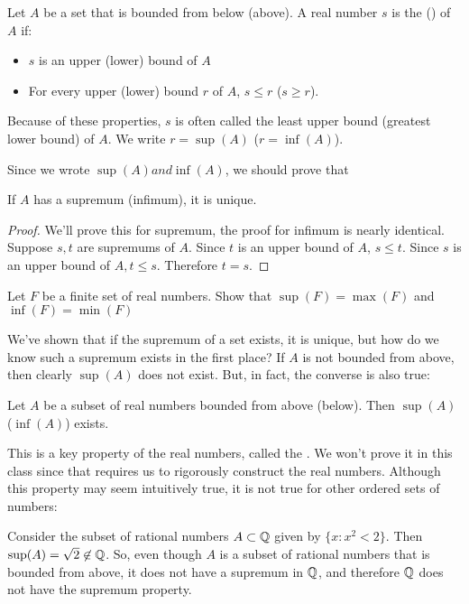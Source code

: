 \documentclass[../notes.tex]{subfiles}
\begin{document}
\begin{definition}
    Let $A$ be a set that is bounded from below (above). A real number $s$ is the  () of $A$ if:
    \begin{itemize}
        \item $s$ is an upper (lower) bound of $A$
        \item For every upper (lower) bound $r$ of $A$, $s\leq r$ ($s\geq r$). 
    \end{itemize}
    Because of these properties, $s$ is often called the least upper bound (greatest lower bound) of $A$. We write $r=\sup(A)$ ($r=\inf(A)$). 
\end{definition}

Since we wrote $\sup(A) and \inf(A)$, we should prove that 

\begin{proposition}
    If $A$ has a supremum (infimum), it is unique.
\end{proposition}
\begin{proof}
    We'll prove this for supremum, the proof for infimum is nearly identical. Suppose $s, t$ are supremums of $A$. Since $t$ is an upper bound of $A$, $s\leq t$. Since $s$ is an upper bound of $A, t\leq s$. Therefore $t=s$. 
\end{proof}

\begin{exercise}
\label{ex:sup-extend-max}
    Let $F$ be a finite set of real numbers. Show that $\sup(F)=\max(F)$ and $\inf(F) = \min(F)$
\end{exercise}

We've shown that if the supremum of a set exists, it is unique, but how do we know such a supremum exists in the first place? If $A$ is not bounded from above, then clearly $\sup(A)$ does not exist. But, in fact, the converse is also true:

\begin{proposition}
\label{prop:sup-prop}
    Let $A$ be a subset of real numbers bounded from above (below). Then $\sup(A)$ ($\inf(A)$) exists.
\end{proposition}

This is a key property of the real numbers, called the . We won't prove it in this class since that requires us to rigorously construct the real numbers. Although this property may seem intuitively true, it is not true for other ordered sets of numbers:

\begin{example}
    Consider the subset of rational numbers $A\subset \mathbb Q$ given by $\{x : x^2 < 2\}$. Then $\sup(A)=\sqrt{2}\not\in \mathbb Q$. So, even though $A$ is a subset of rational numbers that is bounded from above, it does not have a supremum in $\mathbb Q$, and therefore $\mathbb Q$ does not have the supremum property. 
\end{example}
\end{document}
